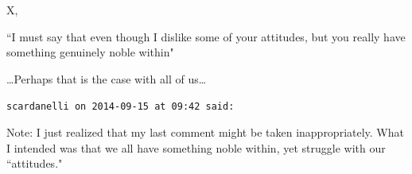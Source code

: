 \begin{footnotesize}
\begin{sffamily}
X,

``I must say that even though I dislike some of your attitudes, but you really have something genuinely noble within"

…Perhaps that is the case with all of us…


\hfill

\texttt{scardanelli on 2014-09-15 at 09:42 said: }

Note: I just realized that my last comment might be taken inappropriately. What I intended was that we all have something noble within, yet struggle with our ``attitudes."


\end{sffamily}\end{footnotesize}

